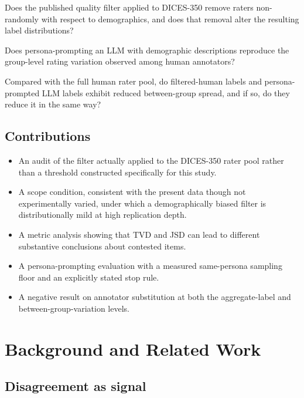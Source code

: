 \documentclass[11pt,a4paper]{article}
\begin{document}
\begin{description}[leftmargin=2.2em,style=nextline]
\item[RQ1.] Does the published quality filter applied to DICES-350 remove raters non-randomly
with respect to demographics, and does that removal alter the resulting label distributions?
\item[RQ2.] Does persona-prompting an LLM with demographic descriptions reproduce the group-level
rating variation observed among human annotators?
\item[RQ3.] Compared with the full human rater pool, do filtered-human labels and persona-prompted
LLM labels exhibit reduced between-group spread, and if so, do they reduce it in the same way?
\end{description}

\subsection{Contributions}

\begin{itemize}[leftmargin=1.6em]
\item An audit of the filter actually applied to the DICES-350 rater pool rather than a threshold
constructed specifically for this study.
\item A scope condition, consistent with the present data though not experimentally varied,
under which a demographically biased filter is distributionally mild at high replication depth.
\item A metric analysis showing that TVD and JSD can lead to different substantive conclusions
about contested items.
\item A persona-prompting evaluation with a measured same-persona sampling floor and an
explicitly stated stop rule.
\item A negative result on annotator substitution at both the aggregate-label and
between-group-variation levels.
\end{itemize}

\section{Background and Related Work}

\subsection{Disagreement as signal}
\end{document}
